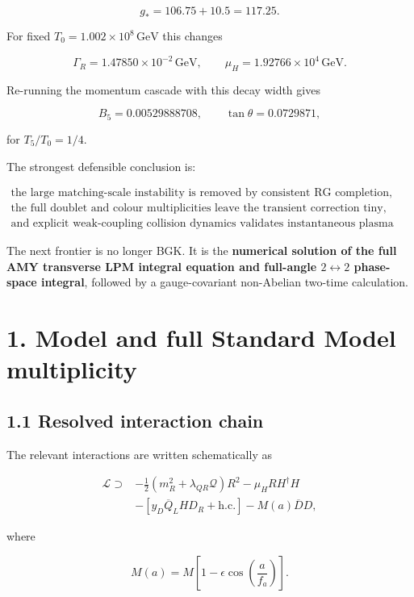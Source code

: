 \documentclass[
  10pt,
]{article}
\begin{document}
\[
\boxed{
g_*=106.75+10.5=117.25.
}
\]

For fixed \(T_0=1.002\times10^8\,\mathrm{GeV}\) this changes

\[
\Gamma_R=1.47850\times10^{-2}\,\mathrm{GeV},
\qquad
\mu_H=1.92766\times10^4\,\mathrm{GeV}.
\]

Re-running the momentum cascade with this decay width gives

\[
\boxed{
B_5=0.00529888708,
\qquad
\tan\theta=0.0729871,
}
\]

for \(T_5/T_0=1/4\).

The strongest defensible conclusion is:

\[
\boxed{
\begin{gathered}
\text{the large matching-scale instability is removed by consistent RG completion,}\\
\text{the full doublet and colour multiplicities leave the transient correction tiny,}\\
\text{and explicit weak-coupling collision dynamics validates instantaneous plasma equilibration.}
\end{gathered}
}
\]

The next frontier is no longer BGK. It is the \textbf{numerical solution
of the full AMY transverse LPM integral equation and full-angle
\(2\leftrightarrow2\) phase-space integral}, followed by a
gauge-covariant non-Abelian two-time calculation.

\section{1. Model and full Standard Model
multiplicity}\label{model-and-full-standard-model-multiplicity}

\subsection{1.1 Resolved interaction
chain}\label{resolved-interaction-chain}

The relevant interactions are written schematically as

\[
\begin{aligned}
\mathcal L\supset{}&
-\frac12\left(m_R^2+\lambda_{QR}\mathcal Q\right)R^2
-\mu_H R H^\dagger H
\\
&-
\left[y_D\overline Q_L H D_R+\mathrm{h.c.}\right]
-M(a)\overline DD,
\end{aligned}
\]

where

\[
M(a)=M\left[1-\epsilon\cos\left(\frac a{f_a}\right)\right].
\]
\end{document}
